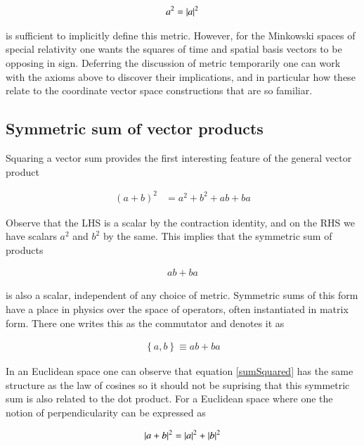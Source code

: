 \documentclass{article}
\newcommand{\symmetric}[2]{{\left\{{#1},{#2}\right\}}}
\begin{document}
\begin{align}
a^2 = \left\lvert{a}\right\rvert^2
\end{align}

is sufficient to implicitly define this metric.  However, for the Minkowski spaces of special relativity one wants the squares of time and spatial basis vectors to be opposing in sign.  Deferring the discussion of metric temporarily one can work with the axioms above to discover their implications, and in particular how these relate to the coordinate vector space constructions that are so familiar.

\subsection{ Symmetric sum of vector products }

Squaring a vector sum provides the first interesting feature of the general vector product

\begin{align}\label{sumSquared}
(a + b)^2 %
&= a^2 + b^2 + a b + b a
\end{align}

Observe that the LHS is a scalar by the contraction identity, and on the RHS we have scalars $a^2$ and $b^2$ by the same.  This implies that the symmetric sum of products

\begin{align*}
a b + b a
\end{align*}

is also a scalar, independent of any choice of metric.  Symmetric sums of this form have a place in physics over the space of operators, often instantiated in matrix form.  There one writes this as the commutator and denotes it as

\begin{align}\label{eqn:anticommutator}
\symmetric{a}{b} \equiv a b + b a
\end{align}

In an Euclidean space one can observe that equation \ref{sumSquared} has the same structure as the law of cosines so it should not be suprising that this symmetric sum is also related to the dot product.  For a Euclidean space where one the notion of perpendicularity can be expressed as

\begin{align*}
\left\lvert{ a + b }\right\rvert^2 = \left\lvert{a}\right\rvert^2 + \left\lvert{b}\right\rvert^2
\end{align*}
\end{document}

